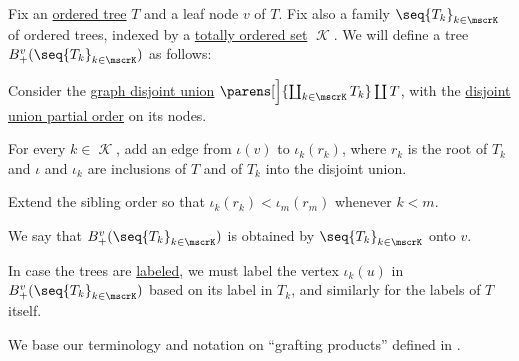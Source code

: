 \begin{definition}\label{def:ordered_tree_grafting}\mimprovised
  Fix an \hyperref[def:ordered_tree]{ordered tree} \( T \) and a leaf node \( v \) of \( T \). Fix also a family \( \seq{ T_k }_{k \in \mscrK} \) of ordered trees, indexed by a \hyperref[def:totally_ordered_set]{totally ordered set} \( \mscrK \). We will define a tree \( B_+^v(\seq{ T_k }_{k \in \mscrK}) \) as follows:
  \begin{thmenum}
     Consider the \hyperref[def:graph_disjoint_union]{graph disjoint union} \( \parens[\Big]{ \coprod_{k \in \mscrK} T_k } \coprod T \), with the \hyperref[thm:order_category_isomorphism_properties/coproduct]{disjoint union partial order} on its nodes.

     For every \( k \in \mscrK \), add an edge from \( \iota(v) \) to \( \iota_k(r_k) \), where \( r_k \) is the root of \( T_k \) and \( \iota \) and \( \iota_k \) are inclusions of \( T \) and of \( T_k \) into the disjoint union.

     Extend the sibling order so that \( \iota_k(r_k) < \iota_m(r_m) \) whenever \( k < m \).
  \end{thmenum}

  We say that \( B_+^v(\seq{ T_k }_{k \in \mscrK}) \) is obtained by  \( \seq{ T_k }_{k \in \mscrK} \) onto \( v \).
\end{definition}
\begin{comments}
  \item In case the trees are \hyperref[def:labeled_tree]{labeled}, we must label the vertex \( \iota_k(u) \) in \( B_+^v(\seq{ T_k }_{k \in \mscrK}) \) based on its label in \( T_k \), and similarly for the labels of \( T \) itself.

  \item We base our terminology and notation on \enquote{grafting products} defined in .
\end{comments}


